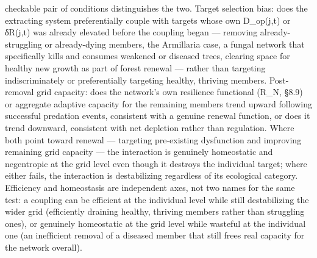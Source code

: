 \documentclass[
]{article}
\begin{document}
checkable pair of conditions distinguishes the two. Target selection
bias: does the extracting system preferentially couple with targets
whose own D\_op(j,t) or δR(j,t) was already elevated before the coupling
began --- removing already-struggling or already-dying members, the
Armillaria case, a fungal network that specifically kills and consumes
weakened or diseased trees, clearing space for healthy new growth as
part of forest renewal --- rather than targeting indiscriminately or
preferentially targeting healthy, thriving members. Post-removal grid
capacity: does the network's own resilience functional (R\_N, §8.9) or
aggregate adaptive capacity for the remaining members trend upward
following successful predation events, consistent with a genuine renewal
function, or does it trend downward, consistent with net depletion
rather than regulation. Where both point toward renewal --- targeting
pre-existing dysfunction and improving remaining grid capacity --- the
interaction is genuinely homeostatic and negentropic at the grid level
even though it destroys the individual target; where either fails, the
interaction is destabilizing regardless of its ecological category.
Efficiency and homeostasis are independent axes, not two names for the
same test: a coupling can be efficient at the individual level while
still destabilizing the wider grid (efficiently draining healthy,
thriving members rather than struggling ones), or genuinely homeostatic
at the grid level while wasteful at the individual one (an inefficient
removal of a diseased member that still frees real capacity for the
network overall).
\end{document}
